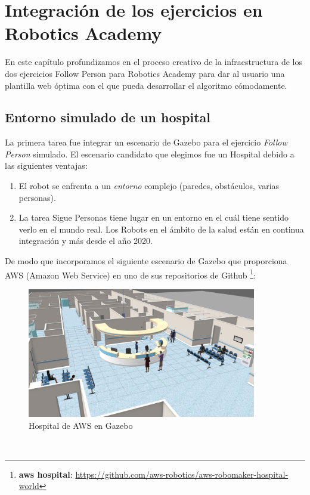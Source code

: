 \chapter{Integración de los ejercicios en Robotics Academy}
\label{cap:capitulo5}

En este capítulo profundizamos en el proceso creativo de la infraestructura de los dos ejercicios Follow Person para Robotics Academy para dar al usuario una plantilla web óptima con el que pueda desarrollar el algoritmo cómodamente.\\




\section{Entorno simulado de un hospital}
\label{sec:hospital_gazebo}

La primera tarea fue integrar un escenario de Gazebo para el ejercicio \textit{Follow Person} simulado. El escenario candidato que elegimos fue un Hospital debido a las siguientes ventajas:

\begin{enumerate}
	\item El robot se enfrenta a un \textit{entorno} complejo (paredes, obstáculos, varias personas).
	\item La tarea Sigue Personas tiene lugar en un entorno en el cuál tiene sentido verlo en el mundo real. Los Robots en el ámbito de la salud están en continua integración y más desde el año 2020.
\end{enumerate}

De modo que incorporamos el siguiente escenario de Gazebo que proporciona AWS (Amazon Web Service) en uno de sus repositorios de Github \footnote{\textbf{aws hospital}: \url{https://github.com/aws-robotics/aws-robomaker-hospital-world}}:\\

\begin{figure} [H]
  \begin{center}
    \includegraphics[width=10cm]{imagenes/cap5/hospital_world.png}
  \end{center}
  \caption[Hospital de AWS en Gazebo]{Hospital de AWS en Gazebo}
  \label{fig:hospital_gazebo}
\end{figure}\

